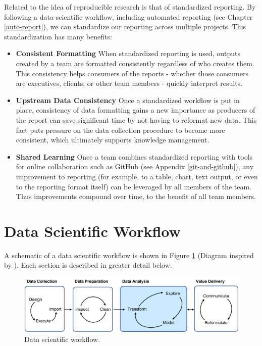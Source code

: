 \documentclass[
]{krantz}
\providecommand{\tightlist}{%
  \setlength{\itemsep}{0pt}\setlength{\parskip}{0pt}}
\begin{document}
Related to the idea of reproducible research is that of standardized reporting. By following a data-scientific workflow, including automated reporting (see Chapter \ref{auto-report}), we can standardize our reporting across multiple projects. This standardization has many benefits:

\begin{itemize}
\tightlist
\item
  \textbf{Consistent Formatting} When standardized reporting is used, outputs created by a team are formatted consistently regardless of who creates them. This consistency helps consumers of the reports - whether those consumers are executives, clients, or other team members - quickly interpret results.
\item
  \textbf{Upstream Data Consistency} Once a standardized workflow is put in place, consistency of data formatting gains a new importance as producers of the report can save significant time by not having to reformat new data. This fact puts pressure on the data collection procedure to become more consistent, which ultimately supports knowledge management.
\item
  \textbf{Shared Learning} Once a team combines standardized reporting with tools for online collaboration such as GitHub (see Appendix \ref{git-and-github}), any improvement to reporting (for example, to a table, chart, text output, or even to the reporting format itself) can be leveraged by all members of the team. Thus improvements compound over time, to the benefit of all team members.
\end{itemize}

\hypertarget{data-scientific-workflow}{%
\section{Data Scientific Workflow}\label{data-scientific-workflow}}

A schematic of a data scientific workflow is shown in Figure \ref{fig:ds-workflow} (Diagram inspired by \citet{Wickham2016}). Each section is described in greater detail below.

\begin{figure}
\includegraphics[width=0.9\linewidth]{images/data_science_workflow2} \caption{Data scientific workflow.}\label{fig:ds-workflow}
\end{figure}
\end{document}
